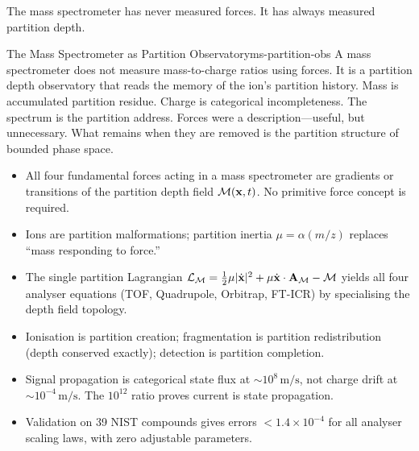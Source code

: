 The mass spectrometer has never measured forces.  It has always measured
partition depth.

\begin{consequence}{The Mass Spectrometer as Partition Observatory}{ms-partition-obs}
  A mass spectrometer does not measure mass-to-charge ratios using forces.
  It is a partition depth observatory that reads the memory of the ion's
  partition history.  Mass is accumulated partition residue.  Charge is
  categorical incompleteness.  The spectrum is the partition address.
  Forces were a description---useful, but unnecessary.  What remains when
  they are removed is the partition structure of bounded phase space.
\end{consequence}

\bigskip
\begin{tcolorbox}[colback=crownblue!5, colframe=crownblue!60!black,
                  title={\textbf{Chapter 21 Summary}}]
\begin{itemize}[noitemsep]
  \item All four fundamental forces acting in a mass spectrometer are
    gradients or transitions of the partition depth field $\mathcal{M}(\mathbf{x},t)$.
    No primitive force concept is required.
  \item Ions are partition malformations; partition inertia $\mu = \alpha(m/z)$
    replaces ``mass responding to force.''
  \item The single partition Lagrangian $\mathcal{L}_{\mathcal{M}} = \frac{1}{2}\mu
    |\dot{\mathbf{x}}|^2 + \mu\dot{\mathbf{x}}\cdot\mathbf{A}_{\mathcal{M}} - \mathcal{M}$
    yields all four analyser equations (TOF, Quadrupole, Orbitrap, FT-ICR)
    by specialising the depth field topology.
  \item Ionisation is partition creation; fragmentation is partition
    redistribution (depth conserved exactly); detection is partition completion.
  \item Signal propagation is categorical state flux at ${\sim}10^8\,\mathrm{m/s}$,
    not charge drift at ${\sim}10^{-4}\,\mathrm{m/s}$.  The $10^{12}$ ratio
    proves current is state propagation.
  \item Validation on 39 NIST compounds gives errors $< 1.4\times 10^{-4}$
    for all analyser scaling laws, with zero adjustable parameters.
\end{itemize}
\end{tcolorbox}
